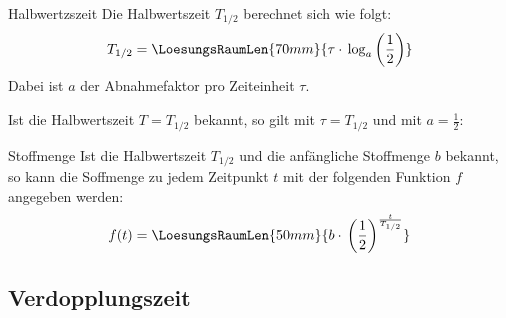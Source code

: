 \newpage




\begin{gesetz}{Halbwertzszeit}{}
  Die Halbwertszeit $T_{1/2}$ berechnet sich wie folgt:
  $$T_{1/2} = \LoesungsRaumLen{70mm}{\tau \cdot{} \log_a\left(\frac12\right)}$$
  Dabei ist $a$ der Abnahmefaktor pro Zeiteinheit $\tau$.
\end{gesetz}

Ist die Halbwertszeit $T = T_{1/2}$ bekannt, so gilt mit
$\tau=T_{1/2}$ und mit $a=\frac12$:

\begin{gesetz}{Stoffmenge}{}
  Ist die Halbwertszeit $T_{1/2}$ und die anfängliche Stoffmenge $b$
  bekannt, so kann die Soffmenge zu jedem Zeitpunkt $t$ mit der
  folgenden Funktion $f$ angegeben werden:
  \leserluft{}
  \leserluft{}  
  $$f(t) = \LoesungsRaumLen{50mm}{b\cdot{}\left(\frac12\right)^\frac{t}{T_{1/2}}}$$
\end{gesetz}
  
\newpage
{}

\subsection{Verdopplungszeit}

